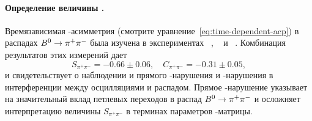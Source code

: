 

\paragraph{\boldmath Определение величины \aphi. } Времязависимая \cpconj-асимметрия (смотрите уравнение~\eqref{eq:time-dependent-acp}) в распадах $B^0\to\pi^+\pi^-$ была изучена в экспериментах \belle~\cite{belle_btopipi}, \babar~\cite{babar_btopipi} и \lhcb~\cite{lhcb_btopipi}.  Комбинация результатов этих измерений дает~\cite{hfag}
\begin{equation}\label{eq:CSpipi}
 S_{\pi^+\pi^-} = -0.66 \pm 0.06,\quad
 C_{\pi^+\pi^-} = -0.31 \pm 0.05,
\end{equation}
и свидетельствует о наблюдении и прямого \cpconj-нарушения и \cpconj-нарушения в интерференции между осцилляциями и распадом.  Прямое \cpconj-нарушение указывает на значительный вклад петлевых переходов в распад $B^0\to\pi^+\pi^-$ и осложняет интерпретацию величины $S_{\pi^+\pi^-}$ в терминах параметров \ckm-матрицы.  

